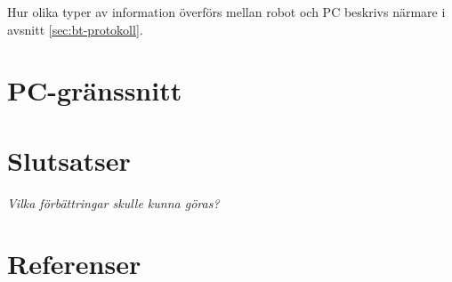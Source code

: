 \documentclass[a4paper,12pt]{article}
\begin{document}
Hur olika typer av information överförs mellan robot och PC beskrivs närmare i avsnitt \ref{sec:bt-protokoll}.


\section{PC-gränssnitt}

\section{Slutsatser}
\emph{Vilka förbättringar skulle kunna göras?}

\newpage
\section*{Referenser}


\newpage
\appendix

\end{document}
